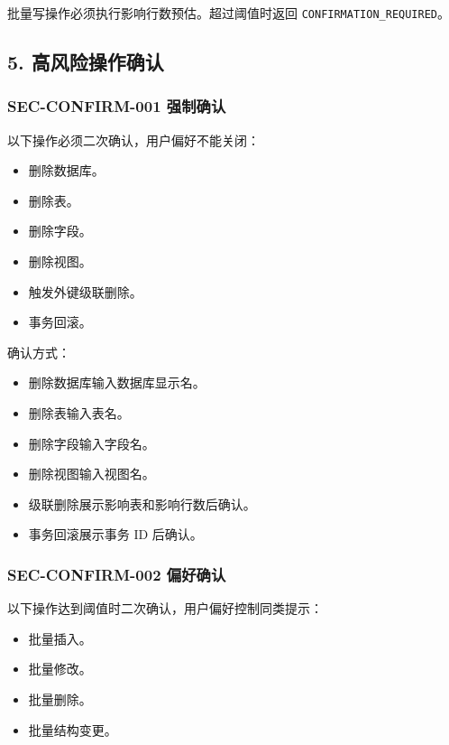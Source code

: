 \documentclass[
  a4paper,
  UTF8]{ctexart}
\providecommand{\tightlist}{%
  \setlength{\itemsep}{0pt}\setlength{\parskip}{0pt}}
\begin{document}
批量写操作必须执行影响行数预估。超过阈值时返回
\texttt{CONFIRMATION\_REQUIRED}。

\hypertarget{ux9ad8ux98ceux9669ux64cdux4f5cux786eux8ba4}{%
\subsection{5.
高风险操作确认}\label{ux9ad8ux98ceux9669ux64cdux4f5cux786eux8ba4}}

\hypertarget{sec-confirm-001-ux5f3aux5236ux786eux8ba4}{%
\subsubsection{SEC-CONFIRM-001
强制确认}\label{sec-confirm-001-ux5f3aux5236ux786eux8ba4}}

以下操作必须二次确认，用户偏好不能关闭：

\begin{itemize}
\tightlist
\item
  删除数据库。
\item
  删除表。
\item
  删除字段。
\item
  删除视图。
\item
  触发外键级联删除。
\item
  事务回滚。
\end{itemize}

确认方式：

\begin{itemize}
\tightlist
\item
  删除数据库输入数据库显示名。
\item
  删除表输入表名。
\item
  删除字段输入字段名。
\item
  删除视图输入视图名。
\item
  级联删除展示影响表和影响行数后确认。
\item
  事务回滚展示事务 ID 后确认。
\end{itemize}

\hypertarget{sec-confirm-002-ux504fux597dux786eux8ba4}{%
\subsubsection{SEC-CONFIRM-002
偏好确认}\label{sec-confirm-002-ux504fux597dux786eux8ba4}}

以下操作达到阈值时二次确认，用户偏好控制同类提示：

\begin{itemize}
\tightlist
\item
  批量插入。
\item
  批量修改。
\item
  批量删除。
\item
  批量结构变更。
\end{itemize}
\end{document}
